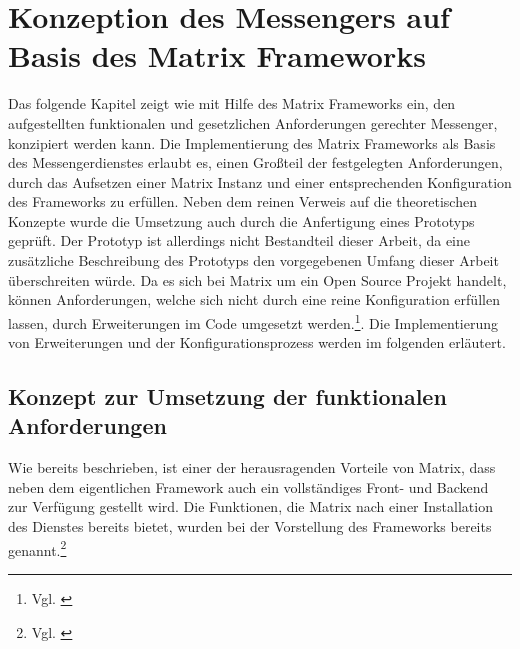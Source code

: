 \section{Konzeption des Messengers auf Basis des Matrix Frameworks}\label{chapter:km}
Das folgende Kapitel zeigt wie mit Hilfe des Matrix Frameworks ein, den aufgestellten funktionalen und gesetzlichen Anforderungen gerechter Messenger, konzipiert werden kann.
Die Implementierung des Matrix Frameworks als Basis des Messengerdienstes erlaubt es, einen Großteil der festgelegten Anforderungen, durch das Aufsetzen einer Matrix Instanz und einer entsprechenden Konfiguration des Frameworks zu erfüllen. Neben dem reinen Verweis auf die theoretischen Konzepte wurde die Umsetzung auch durch die Anfertigung eines Prototyps geprüft. Der Prototyp ist allerdings nicht Bestandteil dieser Arbeit, da eine zusätzliche Beschreibung des Prototyps den vorgegebenen Umfang dieser Arbeit überschreiten würde.  
Da es sich bei Matrix um ein Open Source Projekt handelt, können Anforderungen, welche sich nicht durch eine reine Konfiguration erfüllen lassen, durch Erweiterungen im Code umgesetzt werden.\footnote{Vgl. \cite{Github2020}}. Die Implementierung von Erweiterungen und der Konfigurationsprozess werden im folgenden erläutert.

\subsection{Konzept zur Umsetzung der funktionalen Anforderungen}\label{chapter:am}
Wie bereits beschrieben, ist einer der herausragenden Vorteile von Matrix, dass neben dem eigentlichen Framework auch ein vollständiges Front- und Backend zur Verfügung gestellt wird. Die Funktionen, die Matrix nach einer Installation des Dienstes bereits bietet, wurden bei der Vorstellung des Frameworks bereits genannt.\footnote{Vgl. \cite{Github2020}}

